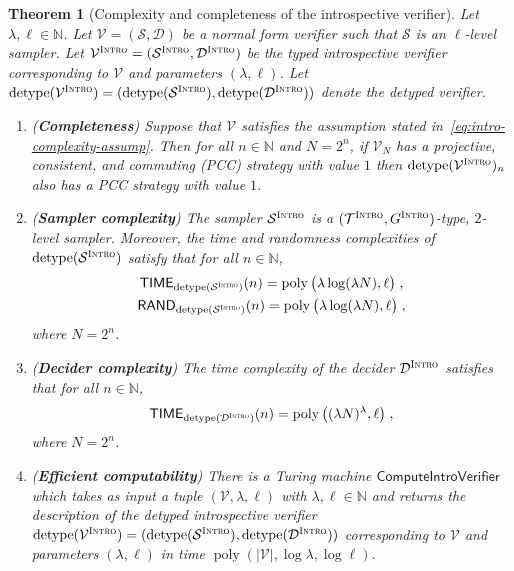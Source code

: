 \documentclass[11pt]{article}
\newtheorem{theorem}{Theorem}[section]
\theoremstyle{definition}
\newcommand{\N}{\ensuremath{\mathbb{N}}}
\DeclareMathOperator{\poly}{poly}
\newcommand{\abs}[1]{\left\vert {#1} \right\vert}
\newcommand{\sampler}{\mathcal{S}}
\newcommand{\decider}{\mathcal{D}}
\newcommand{\verifier}{\mathcal{V}}
\newcommand{\detype}{\mathrm{detype}}
\newcommand{\type}{\mathcal{T}}
\newcommand{\gamestyle}[1]{\ensuremath{\textsc{#1}}\xspace}
\newcommand{\intro}{\gamestyle{Intro}}
\newcommand{\TIME}{\mathsf{TIME}}
\newcommand{\RAND}{\mathsf{RAND}}
\newcommand{\tmstyle}[1]{\ensuremath{\mathsf{#1}}}
\newcommand{\ComputeIntroVerifier}{\tmstyle{ComputeIntroVerifier}}
\begin{document}
\begin{theorem}[Complexity and completeness of the introspective verifier]
  \label{thm:intro-completeness}
  Let $\lambda,\ell \in \N$.
  Let $\verifier = (\sampler, \decider)$ be a normal form verifier such that
  $\sampler$ is an $\ell$-level sampler.
  Let $\verifier^\intro = (\sampler^\intro, \decider^\intro)$ be the typed
  introspective verifier corresponding to $\verifier$ and parameters
  $(\lambda,\ell)$.
  Let $\detype(\verifier^\intro) =
  (\detype(\sampler^\intro),\detype(\decider^\intro))$ denote the detyped
  verifier.

  \begin{enumerate}
  \item (\textbf{Completeness}) Suppose that $\verifier$ satisfies the
    assumption stated in~\eqref{eq:intro-complexity-assump}.
    Then for all $n \in \N$ and $N = 2^n$, if $\verifier_N$ has a projective,
    consistent, and commuting (PCC) strategy with value $1$ then
    $\detype(\verifier^\intro)_n$ also has a PCC strategy with value $1$.
  \item (\textbf{Sampler complexity}) The sampler $\sampler^\intro$ is a
    $(\type^\intro,G^\intro)$-type, $2$-level sampler.
    Moreover, the time and randomness complexities of $\detype(\sampler^\intro)$
    satisfy that for all $n\in \N$,
    \begin{gather*}
      \TIME_{\detype(\sampler^\intro)}(n) = \poly \big (\lambda\log (\lambda
      N),\ell \big)\;, \\
      \RAND_{\detype(\sampler^\intro)}(n) = \poly \big (\lambda\log (\lambda N)
      ,\ell\big)\;,
    \end{gather*}
    where $N = 2^n$.

  \item (\textbf{Decider complexity}) The time complexity of the decider
    $\decider^\intro$ satisfies that for all $n\in \N$,
    \[
      \TIME_{\detype(\decider^\intro)}(n) = \poly \big ((\lambda
      N)^\lambda,\ell\big)\;,
    \]
    where $N=2^n$.

  \item (\textbf{Efficient computability}) \label{enu:intro-computability} There
    is a Turing machine $\ComputeIntroVerifier$ which takes as input a tuple
    $(\verifier, \lambda, \ell)$ with $\lambda, \ell \in \N$ and returns
    the description of the detyped introspective verifier
    $\detype(\verifier^\intro) =
    (\detype(\sampler^\intro),\detype(\decider^\intro))$ corresponding to
    $\verifier$ and parameters $(\lambda,\ell)$ in time
    $\poly(\abs{\verifier}, \log \lambda, \log \ell)$.

  \end{enumerate}
\end{theorem}
\end{document}

